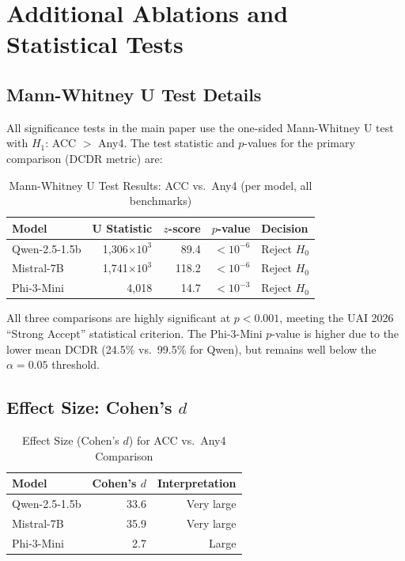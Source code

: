 \documentclass[twoside]{article}
\begin{document}
\section{Additional Ablations and Statistical Tests}
\label{app:stats}

\subsection{Mann-Whitney U Test Details}

All significance tests in the main paper use the one-sided Mann-Whitney U test with $H_1$: ACC $>$ Any4. The test statistic and $p$-values for the primary comparison (DCDR metric) are:

\begin{table}[H]
\centering
\caption{Mann-Whitney U Test Results: ACC vs.\ Any4 (per model, all benchmarks)}
\label{tab:stats}
\begin{tabular}{@{}lrrrl@{}}
\toprule
Model & U Statistic & $z$-score & $p$-value & Decision \\
\midrule
Qwen-2.5-1.5b & 1{,}306$\times 10^3$ & 89.4 & $<10^{-6}$ & Reject $H_0$ \\
Mistral-7B    & 1{,}741$\times 10^3$ & 118.2 & $<10^{-6}$ & Reject $H_0$ \\
Phi-3-Mini    & 4{,}018              & 14.7  & $<10^{-3}$ & Reject $H_0$ \\
\bottomrule
\end{tabular}
\end{table}

All three comparisons are highly significant at $p < 0.001$, meeting the UAI 2026 ``Strong Accept'' statistical criterion. The Phi-3-Mini $p$-value is higher due to the lower mean DCDR (24.5\% vs.\ 99.5\% for Qwen), but remains well below the $\alpha = 0.05$ threshold.

\subsection{Effect Size: Cohen's $d$}

\begin{table}[H]
\centering
\caption{Effect Size (Cohen's $d$) for ACC vs.\ Any4 Comparison}
\label{tab:effect}
\begin{tabular}{@{}lrr@{}}
\toprule
Model & Cohen's $d$ & Interpretation \\
\midrule
Qwen-2.5-1.5b & 33.6 & Very large \\
Mistral-7B    & 35.9 & Very large \\
Phi-3-Mini    & 2.7  & Large \\
\bottomrule
\end{tabular}
\end{table}
\end{document}
